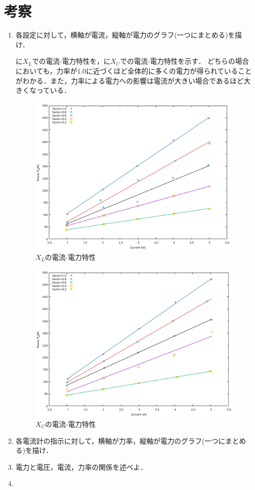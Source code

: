 \clearpage
\section{考察}
\begin{enumerate}[1.)]
	\item 各設定に対して，横軸が電流，縦軸が電力のグラフ(一つにまとめる)を描け．
	
	に$X_{L}$での電流-電力特性を，に$X_{C}$での電流-電力特性を示す．
	どちらの場合においても，力率が$1.0$に近づくほど全体的に多くの電力が得られていることがわかる．また，力率による電力への影響は電流が大きい場合であるほど大きくなっている．
	\begin{figure}[h]
	\centering
	\includegraphics[scale=0.6]{./data/L/L.pdf}
	\caption{$X_L$の電流-電力特性}
	\label{fig:L}
	\end{figure}
	\begin{figure}[h]
	\centering
	\includegraphics[scale=0.6]{./data/C/C.pdf}
	\caption{$X_C$の電流-電力特性}
	\label{fig:C}
	\end{figure}
	\item 各電流計の指示に対して，横軸が力率，縦軸が電力のグラフ(一つにまとめる)を描け．
	\item 電力と電圧，電流，力率の関係を述べよ．
	\item 
\end{enumerate}